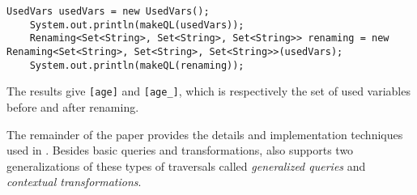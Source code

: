 \begin{lstlisting}[numbers=none]
UsedVars usedVars = new UsedVars();
	System.out.println(makeQL(usedVars));
	Renaming<Set<String>, Set<String>, Set<String>> renaming = new Renaming<Set<String>, Set<String>, Set<String>>(usedVars);
	System.out.println(makeQL(renaming));
\end{lstlisting}

The results give \lstinline{[age]} and \lstinline{[age_]}, which
is respectively the set of used variables before and after renaming.

The remainder of the paper provides the details and implementation
techniques used in \Name. Besides basic queries and transformations,
\name also supports two generalizations of these types of traversals
called \emph{generalized queries} and \emph{contextual transformations}.

